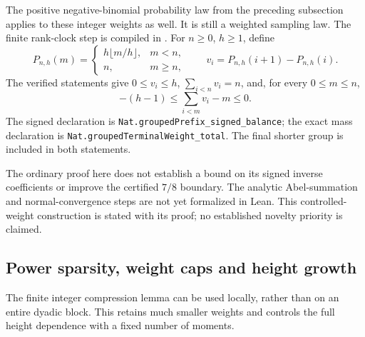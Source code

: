 \documentclass[11pt]{article}
\theoremstyle{definition}
\begin{document}
The positive negative-binomial probability law from the
preceding subsection applies to these integer weights as
well. It is still a weighted sampling law.
The finite rank-clock step is compiled in
.
For $n\ge0$, $h\ge1$, define
\[
 P_{n,h}(m)=
 \begin{cases}h\lfloor m/h\rfloor,&m<n,\\n,&m\ge n,\end{cases}
 \qquad v_i=P_{n,h}(i+1)-P_{n,h}(i).
\]
The verified statements give $0\le v_i\le h$,
$\sum_{i<n}v_i=n$, and, for every $0\le m\le n$,
\[
 -(h-1)\le \sum_{i<m}v_i-m\le0.
\]
The signed declaration is
\texttt{Nat.groupedPrefix\_signed\_balance}; the exact mass
declaration is \texttt{Nat.groupedTerminalWeight\_total}.
The final shorter group is included in both statements.

The ordinary proof here does not establish a bound on its
signed inverse coefficients or improve the certified
$7/8$ boundary. The analytic Abel-summation and normal-convergence
steps are not yet formalized in Lean.
This controlled-weight construction is stated with its proof;
no established novelty priority is claimed.

\subsection{Power sparsity, weight caps and height growth}
\label{sec:prime-carrier-power-tradeoff}

The finite integer compression lemma can be used locally,
rather than on an entire dyadic block. This retains much
smaller weights and controls the full height dependence with
a fixed number of moments.
\end{document}
